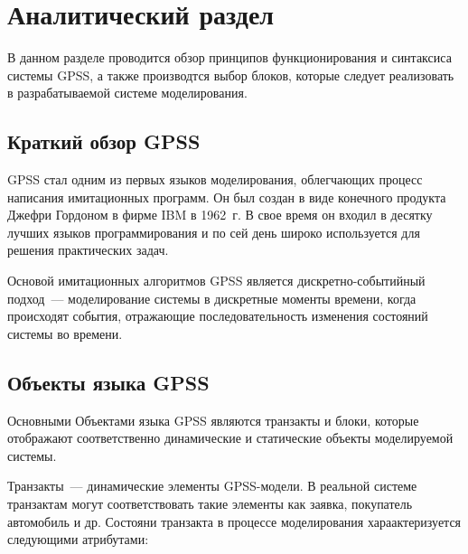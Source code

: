 \chapter{Аналитический раздел}
\label{cha:analysis}

В данном разделе проводится обзор принципов функционирования и синтаксиса системы GPSS, а также производтся выбор блоков, которые следует реализовать в разрабатываемой системе моделирования.

\section{Краткий обзор GPSS}

GPSS стал одним из первых языков моделирования, облегчающих процесс написания имитационных программ. Он был создан в виде конечного продукта Джефри Гордоном в фирме IBM в 1962~г.\cite{ImitGPSS} В свое время он входил в десятку лучших языков программирования и по сей день широко используется для решения практических задач.

Основой имитационных алгоритмов GPSS является дискретно-событийный подход~--- моделирование сис­темы в дискретные моменты времени, когда происходят события, от­ражающие последовательность изменения состояний системы во времени.\cite{ImitGPSS}

\section{Объекты языка GPSS}

Основными Объектами языка GPSS являются транзакты и блоки, которые отображают соответственно динамические и статические объекты моделируемой системы.

Транзакты~--- динамические элементы GPSS-модели. В реальной системе транзактам могут соответствовать такие элементы как заявка, покупатель автомобиль и др. Состояни транзакта в процессе моделирования хараактеризуется следующими атрибутами:


